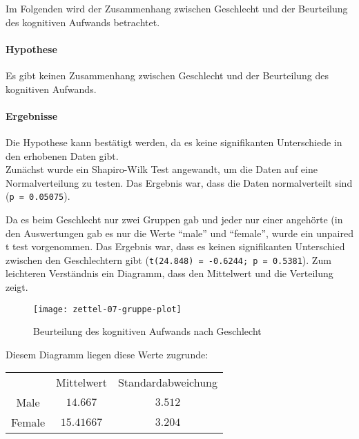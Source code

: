\documentclass[a4paper,10pt]{scrartcl}
\begin{document}
\kopf
\renewcommand{\figurename}{Figure}


Im Folgenden wird der Zusammenhang zwischen Geschlecht und der Beurteilung des kognitiven Aufwands betrachtet.

\paragraph{Hypothese} Es gibt keinen Zusammenhang zwischen Geschlecht und der Beurteilung des kognitiven Aufwands. 

\paragraph{Ergebnisse} Die Hypothese kann bestätigt werden, da es keine signifikanten Unterschiede in den erhobenen Daten gibt.\\

Zunächst wurde ein Shapiro-Wilk Test angewandt, um die Daten auf eine Normalverteilung zu testen. Das Ergebnis war, dass die Daten normalverteilt sind (\texttt{p = 0.05075}).

Da es beim Geschlecht nur zwei Gruppen gab und jeder nur einer angehörte (in den Auswertungen gab es nur die Werte "`male"' und "`female"', wurde ein unpaired t test vorgenommen. Das Ergebnis war, dass es keinen signifikanten Unterschied zwischen den Geschlechtern gibt (\texttt{t(24.848) = -0.6244; p = 0.5381}). Zum leichteren Verständnis ein Diagramm, dass den Mittelwert und die Verteilung zeigt.

\begin{figure}[hb]
	\caption{Beurteilung des kognitiven Aufwands nach Geschlecht}
	\texttt{[image: zettel-07-gruppe-plot]}
\end{figure}

\newpage 
Diesem Diagramm liegen diese Werte zugrunde:

\begin{tabular}{ccc}
	& Mittelwert & Standardabweichung \\
	Male & $14.667$ & $3.512$ \\
	Female & $15.41667$ & $3.204$
\end{tabular}
\end{document}

